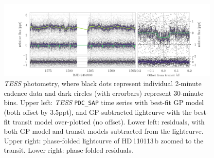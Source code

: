 \documentclass[fleqn,usenatbib]{mnras}
\newcommand{\tess}{{\it TESS}}
\newcommand{\Tplanet}{HD\,110113\,b}
\begin{document}
\begin{figure}
	\includegraphics[width=\textwidth, trim={1.45cm 0.2 0.95cm 0.5}]{Combined_phot_plot_3_GPs_final.pdf}
    \caption{\tess{} photometry, where black dots represent individual 2-minute cadence data and dark circles (with errorbars) represent 30-minute bins. Upper left: \tess{} \texttt{PDC\_SAP} time series with best-fit GP model (both offset by 3.5ppt), and GP-subtracted lightcurve with the best-fit transit model over-plotted (no offset). Lower left: residuals, with both GP model and transit models subtracted from the lightcurve. Upper right: phase-folded lightcurve of \Tplanet{} zoomed to the transit. Lower right: phase-folded residuals. }
    \label{fig:photometry}
\end{figure}
\end{document}
